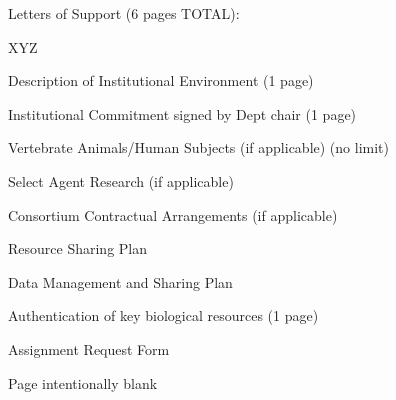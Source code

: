 \documentclass[11pt]{article}
\newcommand{\Red}[1]{{\color{red} #1}\xspace}
\begin{document}
\begin{todolist}
  \item Letters of Support (6 pages TOTAL):
  \begin{todolist}
    \item XYZ
  \end{todolist}
  \item Description of Institutional Environment (1 page)
  \item Institutional Commitment signed by Dept chair (1 page)
  \item Vertebrate Animals/Human Subjects (if applicable) (no limit)
  \item Select Agent Research (if applicable)
  \item Consortium Contractual Arrangements (if applicable)
  \item Resource Sharing Plan
  \item Data Management and Sharing Plan
  \item Authentication of key biological resources (1 page)
  \item Assignment Request Form
\end{todolist}


\newpage
Page intentionally blank

% 

\newpage


\newpage
% 

% 

\newpage


\newpage


\newpage


\newpage


\newpage



\newpage


\newpage


\newpage


\newpage


\newpage


\newpage
\normalem
\printbibliography[title={References Cited}]
\ULforem

\end{document}
